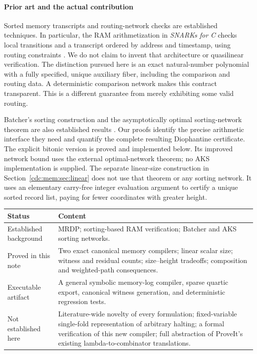 \documentclass[11pt,a4paper]{article}
\theoremstyle{definition}
\theoremstyle{remark}
\begin{document}
\paragraph{Prior art and the actual contribution}
Sorted memory transcripts and routing-network checks are established techniques.
In particular, the RAM arithmetization in \emph{SNARKs for C} checks local
transitions and a transcript ordered by address and timestamp, using routing
constraints \cite{snark}. We do not claim to invent that architecture or
quasilinear verification. The distinction pursued here is an exact
natural-number polynomial with a fully specified, unique auxiliary fiber,
including the comparison and routing data. A deterministic comparison network
makes this contract transparent. This is a different guarantee from merely
exhibiting some valid routing.

Batcher's sorting construction and the asymptotically optimal sorting-network
theorem are also established results \cite{batcher,aks}. Our proofs identify the
precise arithmetic interface they need and quantify the complete resulting
Diophantine certificate. The explicit bitonic version is proved and implemented
below. Its improved network bound uses the external optimal-network theorem;
no AKS implementation is supplied. The separate linear-size construction in
Section~\ref{cdc:mem:sec:linear} does not use that theorem or any sorting network.
It uses an elementary carry-free integer evaluation argument to certify a
unique sorted record list, paying for fewer coordinates with greater height.

\begin{center}
\begin{tabularx}{\textwidth}{@{}p{}X@{}}
\toprule
Status & Content \\
\midrule
Established background & MRDP; sorting-based RAM verification; Batcher and AKS
sorting networks. \\
Proved in this note & Two exact canonical memory compilers; linear scalar size;
witness and residual counts; size--height tradeoffs; composition and weighted-path consequences. \\
Executable artifact & A general symbolic memory-log compiler, sparse quartic
export, canonical witness generation, and deterministic regression tests. \\
Not established here & Literature-wide novelty of every formulation;
fixed-variable single-fold representation of arbitrary halting; a formal
verification of this new compiler; full abstraction of ProveIt's existing
lambda-to-combinator translations. \\
\bottomrule
\end{tabularx}
\end{center}
\end{document}
